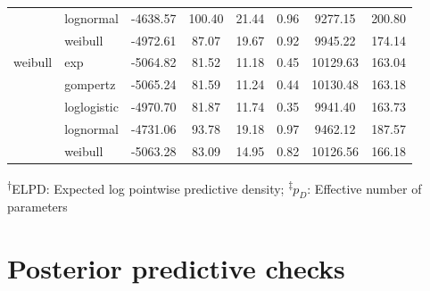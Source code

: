 \documentclass[AMA,STIX1COL]{WileyNJD-v2}
\begin{document}
\begin{table}[H]
\begin{tabular}{l l c c c c c c}
 & lognormal & -4638.57 & 100.40 & 21.44 & 0.96 & 9277.15 & 200.80\\
 & weibull & -4972.61 & 87.07 & 19.67 & 0.92 & 9945.22 & 174.14\\
weibull & exp & -5064.82 & 81.52 & 11.18 & 0.45 & 10129.63 & 163.04\\
 & gompertz & -5065.24 & 81.59 & 11.24 & 0.44 & 10130.48 & 163.18\\
 & loglogistic & -4970.70 & 81.87 & 11.74 & 0.35 & 9941.40 & 163.73\\
 & lognormal & -4731.06 & 93.78 & 19.18 & 0.97 & 9462.12 & 187.57\\
 & weibull & -5063.28 & 83.09 & 14.95 & 0.82 & 10126.56 & 166.18\\
\bottomrule
\end{tabular}
\begin{tablenotes}%
\textsuperscript{$\dagger$}ELPD: Expected log pointwise predictive density;
\textsuperscript{$\ddagger$}$p_D$: Effective number of parameters
\end{tablenotes}
\end{table}

\section{Posterior predictive checks}
\end{document}
